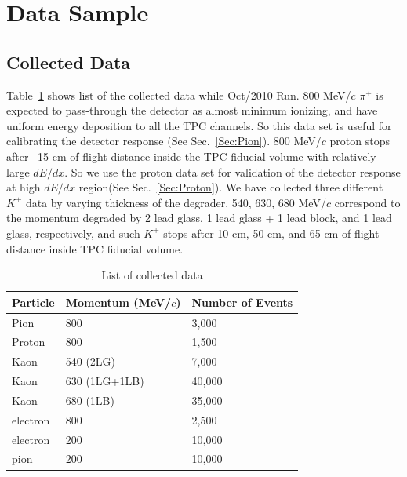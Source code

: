 \section{Data Sample}
\subsection{Collected Data}
Table~\ref{Table:Data} shows list of the collected data while Oct/2010 Run.
800 MeV/$c$ $\pi^+$ is expected to pass-through the detector as almost minimum ionizing,
and have uniform energy deposition to all the TPC channels.
So this data set is useful for calibrating the detector response (See Sec.~\ref{Sec:Pion}).
800 MeV/$c$ proton stops after ~15 cm of flight distance inside the TPC fiducial volume
with relatively large $dE/dx$. So we use the proton data set for validation of the
detector response at high $dE/dx$ region(See Sec.~\ref{Sec:Proton}).
We have collected three different $K^+$ data by varying thickness of the degrader. 
540, 630, 680 MeV/$c$ correspond to the momentum degraded by 
2 lead glass, 1 lead glass + 1 lead block, and 1 lead glass, respectively, 
and such $K^+$ stops after 10 cm, 50 cm, and 65 cm of flight distance inside TPC fiducial volume.

\begin{table}[h]
\begin{center}
\caption{List of collected data}
\begin{tabular}{l|ll}
  Particle  &Momentum (MeV/$c$) &Number of Events\\
\hline
  Pion      &800                &3,000\\
  Proton    &800                &1,500\\
  Kaon      &540 (2LG)          &7,000\\
  Kaon      &630 (1LG+1LB)      &40,000\\
  Kaon      &680 (1LB)          &35,000\\
  electron  &800                &2,500\\
  electron  &200                &10,000\\
  pion      &200                &10,000\\
\end{tabular}
\label{Table:Data}
\end{center}
\end{table}

